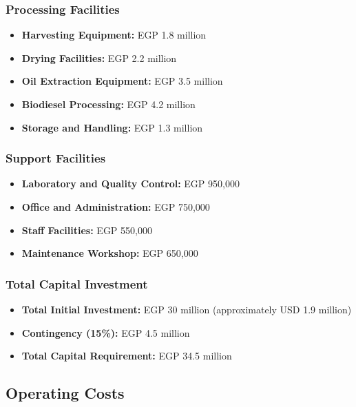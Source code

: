 \subsubsection{Processing Facilities}
\begin{itemize}
    \item \textbf{Harvesting Equipment:} EGP 1.8 million
    \item \textbf{Drying Facilities:} EGP 2.2 million
    \item \textbf{Oil Extraction Equipment:} EGP 3.5 million
    \item \textbf{Biodiesel Processing:} EGP 4.2 million
    \item \textbf{Storage and Handling:} EGP 1.3 million
\end{itemize}

\subsubsection{Support Facilities}
\begin{itemize}
    \item \textbf{Laboratory and Quality Control:} EGP 950,000
    \item \textbf{Office and Administration:} EGP 750,000
    \item \textbf{Staff Facilities:} EGP 550,000
    \item \textbf{Maintenance Workshop:} EGP 650,000
\end{itemize}

\subsubsection{Total Capital Investment}
\begin{itemize}
    \item \textbf{Total Initial Investment:} EGP 30 million (approximately USD 1.9 million)
    \item \textbf{Contingency (15\%):} EGP 4.5 million
    \item \textbf{Total Capital Requirement:} EGP 34.5 million
\end{itemize}

\subsection{Operating Costs}

